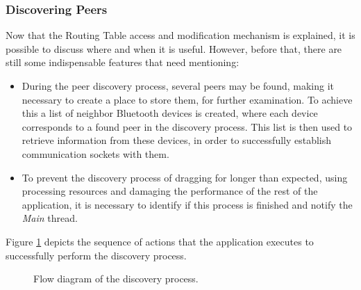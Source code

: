 \subsubsection{Discovering Peers}
\label{subsubsec:disc}

Now that the Routing Table access and modification mechanism is explained, it is possible to discuss where and when it is useful. However, before that, there are still some indispensable features that need mentioning:

\begin{itemize}
	\item During the peer discovery process, several peers may be found, making it necessary to create a place to store them, for further examination. To achieve this a list of neighbor Bluetooth devices is created, where each device corresponds to a found peer in the discovery process. This list is then used to retrieve information from these devices, in order to successfully establish communication sockets with them.
	
	\item To prevent the discovery process of dragging for longer than expected, using processing resources and damaging the performance of the rest of the application, it is necessary to identify if this process is finished and notify the \textit{Main} thread.
\end{itemize}

Figure \ref{fig:discflux} depicts the sequence of actions that the application executes to successfully perform the discovery process.

\begin{figure}[ht]
	\noindent{}
	\caption{\label{fig:discflux} Flow diagram of the discovery process.}
\end{figure}

